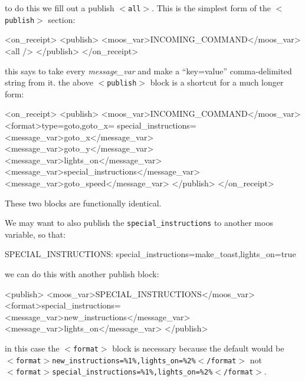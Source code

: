 \documentclass[11pt, letterpaper, oneside]{memoir}
\newcommand{\xmltag}[1]{\texttt{$<$#1$>$}}
\begin{document}
\begin{itemize}
\begin{enumerate}
\begin{small}
\begin{boxedverbatim}
\end{boxedverbatim}
\resetbvlinenumber
\end{small}
to do this we fill out a publish \xmltag{all}. This is the simplest form of the \xmltag{publish} section:
\begin{small}
\begin{boxedverbatim}
    <on_receipt>
      <publish>
        <moos_var>INCOMING_COMMAND</moos_var>
        <all />
      </publish>
    </on_receipt>
\end{boxedverbatim}
\resetbvlinenumber
\end{small}
this says to take every \textit{message\_var} and make a ``key=value'' comma-delimited string from it. the above \xmltag{publish} block is a shortcut for a much longer form:
\begin{small}
\begin{boxedverbatim}
    <on_receipt>
      <publish>
        <moos_var>INCOMING_COMMAND</moos_var>
        <format>type=goto,goto_x=%
        special_instructions=%
        <message_var>goto_x</message_var>
        <message_var>goto_y</message_var>
        <message_var>lights_on</message_var>
        <message_var>special_instructions</message_var>
        <message_var>goto_speed</message_var>
      </publish>
    </on_receipt>
\end{boxedverbatim}
\resetbvlinenumber
\end{small}
These two blocks are functionally identical.

We may want to also publish the \verb|special_instructions| to another moos variable, so that:
\begin{small}
\begin{boxedverbatim}
SPECIAL_INSTRUCTIONS: special_instructions=make_toast,lights_on=true
\end{boxedverbatim}
\resetbvlinenumber
\end{small}
we can do this with another publish block:
\begin{small}
\begin{boxedverbatim}
    <publish>
      <moos_var>SPECIAL_INSTRUCTIONS</moos_var>
      <format>special_instructions=%
      <message_var>new_instructions</message_var>
      <message_var>lights_on</message_var>
    </publish>
\end{boxedverbatim}
\resetbvlinenumber
\end{small}
in this case the \xmltag{format} block is necessary because the default would be \\ 
\xmltag{format$>$new\_instructions=\%1\%,lights\_on=\%2\%$<$/format} not \\
\xmltag{format$>$special\_instructions=\%1\%,lights\_on=\%2\%$<$/format}.
\end{enumerate}


\end{itemize}
\end{document}
